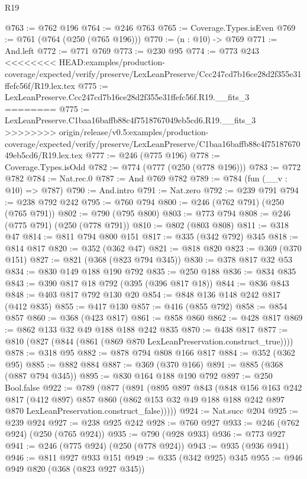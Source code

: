 \begin{lexlean}{R19}
\begin{coremodule}
{{{{{{{{{{{{{{@763 := @762 @196
@764 := @246 @763
@765 := Coverage.Types.isEven
@769 := @761 (@764 (@250 (@765 @196)))
@770 := (n : @10) -> @769
@771 := And.left
@772 := @771 @769
@773 := @230 @95
@774 := @773 @243
<<<<<<<< HEAD:examples/production-coverage/expected/verify/preserve/LexLeanPreserve/Ccc247cd7b16ce28d2f355e31ffefc56f/R19.lex.tex
@775 := LexLeanPreserve.Ccc247cd7b16ce28d2f355e31ffefc56f.R19.__fits_3
========
@775 := LexLeanPreserve.C1baa16baffb88c4f7518767049eb5cd6.R19.__fits_3
>>>>>>>> origin/release/v0.5:examples/production-coverage/expected/verify/preserve/LexLeanPreserve/C1baa16baffb88c4f7518767049eb5cd6/R19.lex.tex
@777 := @246 (@775 @196)
@778 := Coverage.Types.isOdd
@782 := @774 (@777 (@250 (@778 @196)))
@783 := @772 @782
@784 := Nat.rec.{0}
@787 := And @769 @782
@789 := @784 (fun (__v : @10) => @787)
@790 := And.intro
@791 := Nat.zero
@792 := @239 @791
@794 := @238 @792 @242
@795 := @760 @794
@800 := @246 (@762 @791) (@250 (@765 @791))
@802 := @790 (@795 @800)
@803 := @773 @794
@808 := @246 (@775 @791) (@250 (@778 @791))
@810 := @802 (@803 @808)
@811 := @318 @47
@814 := @811 @794 @800 @151
@817 := @335 (@342 @792) @345
@818 := @814 @817
@820 := @352 (@362 @47)
@821 := @818 @820
@823 := @369 (@370 @151)
@827 := @821 (@368 (@823 @794 @345))
@830 := @378 @817 @32 @53
@834 := @830 @149 @188 @190 @792
@835 := @250 @188
@836 := @834 @835
@843 := @390 @817 @18 @792 (@395 (@396 @817 @18))
@844 := @836 @843
@848 := @403 @817 @792 @130 @20
@854 := @848 @136 @148 @242 @817 (@412 @835)
@855 := @417 @130
@857 := @416 (@855 @792)
@858 := @854 @857
@860 := @368 (@423 @817)
@861 := @858 @860
@862 := @428 @817
@869 := @862 @133 @32 @49 @188 @188 @242 @835
@870 := @438 @817
@877 := @810 (@827 (@844 (@861 (@869 @870 LexLeanPreservation.construct_true))))
@878 := @318 @95
@882 := @878 @794 @808 @166 @817
@884 := @352 (@362 @95)
@885 := @882 @884
@887 := @369 (@370 @166)
@891 := @885 (@368 (@887 @794 @345))
@895 := @830 @164 @188 @190 @792
@897 := @250 Bool.false
@922 := @789
    (@877
      (@891
        (@895
          @897
          @843
          (@848
            @156
            @163
            @242
            @817
            (@412 @897)
            @857
            @860
            (@862 @153 @32 @49 @188 @188 @242 @897 @870 LexLeanPreservation.construct_false)))))
@924 := Nat.succ @204
@925 := @239 @924
@927 := @238 @925 @242
@928 := @760 @927
@933 := @246 (@762 @924) (@250 (@765 @924))
@935 := @790 (@928 @933)
@936 := @773 @927
@941 := @246 (@775 @924) (@250 (@778 @924))
@943 := @935 (@936 @941)
@946 := @811 @927 @933 @151
@949 := @335 (@342 @925) @345
@955 := @946 @949 @820 (@368 (@823 @927 @345))
}}}}}}}}}}}}}}
\end{coremodule}
\end{lexlean}
